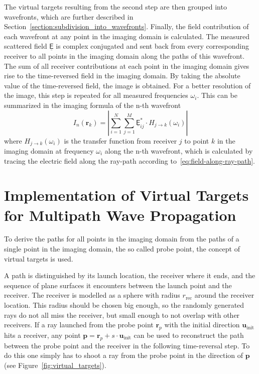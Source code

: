 The virtual targets resulting from the second step are then grouped into wavefronts, which are further described in Section~\ref{section:subdivision_into_wavefronts}.
Finally, the field contribution of each wavefront at any point in the imaging domain is calculated.
The measured scattered field \(\underline{\mathsf{E}}\) is complex conjugated and sent back from every corresponding receiver to all points in the imaging domain along the paths of this wavefront.
The sum of all receiver contributions at each point in the imaging domain gives rise to the time-reversed field in the imaging domain.
By taking the absolute value of the time-reversed field, the image is obtained.
For a better resolution of the image, this step is repeated for all measured frequencies \(\omega_i\).
This can be summarized in the imaging formula of the n-th wavefront
\begin{equation}
    I_n(\bm{r}_k) = |\sum_{i=1}^{N} \sum_{j=1}^{M} \underline{\mathsf{E}}_{ij}^* \cdot H_{j \rightarrow k}(\omega_i)|
\end{equation}
where \(H_{j \rightarrow k}(\omega_i)\) is the transfer function from receiver \(j\) to point \(k\) in the imaging domain at frequency \(\omega_i\) along the n-th wavefront, which is calculated by tracing the electric field along the ray-path according to~\eqref{eq:field-along-ray-path}.


\section{Implementation of Virtual Targets for Multipath Wave Propagation}\label{section:virtual_targets}
To derive the paths for all points in the imaging domain from the paths of a single point in the imaging domain, the so called probe point, the concept of virtual targets is used.

A path is distinguished by its launch location, the receiver where it ends, and the sequence of plane surfaces it encounters between the launch point and the receiver.
The receiver is modelled as a sphere with radius \(r_{\text{rec}}\) around the receiver location.
This radius should be chosen big enough, so the randomly generated rays do not all miss the receiver, but small enough to not overlap with other receivers.
If a ray launched from the probe point \(\bm{r}_p\) with the initial direction \(\bm{u}_{\text{init}}\) hits a receiver, any point \(\bm{p} = \bm{r}_p + s \cdot \bm{u}_{\text{init}}\) can be used to reconstruct the path between the probe point and the receiver in the following time-reversal step.
To do this one simply has to shoot a ray from the probe point in the direction of \(\bm{p}\) (see Figure~\ref{fig:virtual_targets}).

